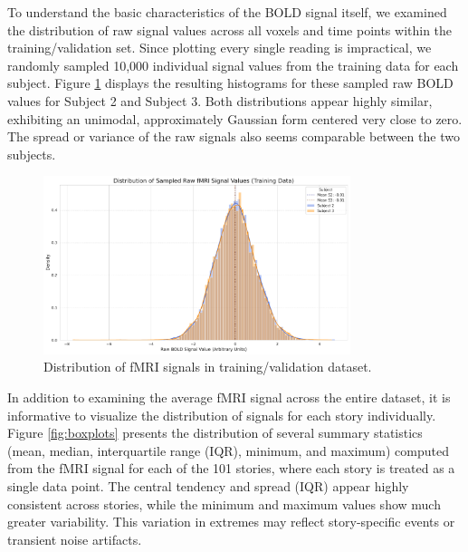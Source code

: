 \documentclass[10pt,letterpaper]{article}
\begin{document}
To understand the basic characteristics of the BOLD signal itself, we examined the distribution of raw signal values across all voxels and time points within the training/validation set. Since plotting every single reading is impractical, we randomly sampled 10,000 individual signal values from the training data for each subject. Figure \ref{fig:fmri_signal} displays the resulting histograms for these sampled raw BOLD values for Subject 2 and Subject 3. Both distributions appear highly similar, exhibiting an unimodal, approximately Gaussian form centered very close to zero. The spread or variance of the raw signals also seems comparable between the two subjects.

\begin{figure}[ht]
    \centering
    \includegraphics[width=0.8\textwidth]{figs/fmri_signal_distribution.pdf}
    \caption{Distribution of fMRI signals in training/validation dataset.}
    \label{fig:fmri_signal}
\end{figure}

In addition to examining the average fMRI signal across the entire dataset, it is informative to visualize the distribution of signals for each story individually. Figure \ref{fig:boxplots} presents the distribution of several summary statistics (mean, median, interquartile range (IQR), minimum, and maximum) computed from the fMRI signal for each of the 101 stories, where each story is treated as a single data point. The central tendency and spread (IQR) appear highly consistent across stories, while the minimum and maximum values show much greater variability. This variation in extremes may reflect story-specific events or transient noise artifacts.
\end{document}
